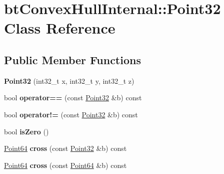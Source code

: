 \hypertarget{classbt_convex_hull_internal_1_1_point32}{\section{bt\+Convex\+Hull\+Internal\+:\+:Point32 Class Reference}
\label{classbt_convex_hull_internal_1_1_point32}
}
\subsection*{Public Member Functions}
\begin{DoxyCompactItemize}
\item 
\hypertarget{classbt_convex_hull_internal_1_1_point32_a5cb36afa59e42669256a8221963e884f}{{\bfseries Point32} (int32\+\_\+t x, int32\+\_\+t y, int32\+\_\+t z)}\label{classbt_convex_hull_internal_1_1_point32_a5cb36afa59e42669256a8221963e884f}

\item 
\hypertarget{classbt_convex_hull_internal_1_1_point32_a02a2d20f1fb48f3d915cdc66c6be2481}{bool {\bfseries operator==} (const \hyperlink{classbt_convex_hull_internal_1_1_point32}{Point32} \&b) const }\label{classbt_convex_hull_internal_1_1_point32_a02a2d20f1fb48f3d915cdc66c6be2481}

\item 
\hypertarget{classbt_convex_hull_internal_1_1_point32_ac638f776e4993f083fa8159bfcee62fe}{bool {\bfseries operator!=} (const \hyperlink{classbt_convex_hull_internal_1_1_point32}{Point32} \&b) const }\label{classbt_convex_hull_internal_1_1_point32_ac638f776e4993f083fa8159bfcee62fe}

\item 
\hypertarget{classbt_convex_hull_internal_1_1_point32_aecd1940311b7d379fbda8716a6bc5ca2}{bool {\bfseries is\+Zero} ()}\label{classbt_convex_hull_internal_1_1_point32_aecd1940311b7d379fbda8716a6bc5ca2}

\item 
\hypertarget{classbt_convex_hull_internal_1_1_point32_ab6b20932652987414586980569efd081}{\hyperlink{classbt_convex_hull_internal_1_1_point64}{Point64} {\bfseries cross} (const \hyperlink{classbt_convex_hull_internal_1_1_point32}{Point32} \&b) const }\label{classbt_convex_hull_internal_1_1_point32_ab6b20932652987414586980569efd081}

\item 
\hypertarget{classbt_convex_hull_internal_1_1_point32_add28d05a98b4bc42928546cfe2a9ed03}{\hyperlink{classbt_convex_hull_internal_1_1_point64}{Point64} {\bfseries cross} (const \hyperlink{classbt_convex_hull_internal_1_1_point64}{Point64} \&b) const }\label{classbt_convex_hull_internal_1_1_point32_add28d05a98b4bc42928546cfe2a9ed03}


\end{DoxyCompactItemize}
